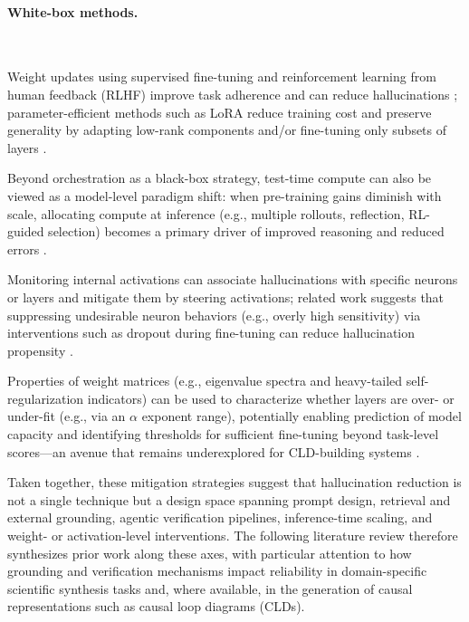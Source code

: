 \paragraph{White-box methods.}~

\begin{description}[style=unboxed,leftmargin=1em,labelindent=0pt]
    \item[Fine-tuning and RLHF.] Weight updates using supervised fine-tuning and reinforcement learning from human feedback (RLHF) improve task adherence and can reduce hallucinations \citep{ouyang2022rlhf}; parameter-efficient methods such as LoRA reduce training cost and preserve generality by adapting low-rank components and/or fine-tuning only subsets of layers \citep{hu2021lora}.

    \item[Test-time compute.] Beyond orchestration as a black-box strategy, test-time compute can also be viewed as a model-level paradigm shift: when pre-training gains diminish with scale, allocating compute at inference (e.g., multiple rollouts, reflection, RL-guided selection) becomes a primary driver of improved reasoning and reduced errors \citep{kaplan2020scaling}.

    \item[Activation monitoring and steering.] Monitoring internal activations can associate hallucinations with specific neurons or layers and mitigate them by steering activations; related work suggests that suppressing undesirable neuron behaviors (e.g., overly high sensitivity) via interventions such as dropout during fine-tuning can reduce hallucination propensity \citep{wang2024adaptive, varshney2023stitch}.

    \item[Predictive analysis of system capacity.] Properties of weight matrices (e.g., eigenvalue spectra and heavy-tailed self-regularization indicators) can be used to characterize whether layers are over- or under-fit (e.g., via an $\alpha$ exponent range), potentially enabling prediction of model capacity and identifying thresholds for sufficient fine-tuning beyond task-level scores---an avenue that remains underexplored for CLD-building systems \citep{martin2021predicting, martin2019traditional}.
\end{description}

\medskip
Taken together, these mitigation strategies suggest that hallucination reduction is not a single technique but a design space spanning prompt design, retrieval and external grounding, agentic verification pipelines, inference-time scaling, and weight- or activation-level interventions. The following literature review therefore synthesizes prior work along these axes, with particular attention to how grounding and verification mechanisms impact reliability in domain-specific scientific synthesis tasks and, where available, in the generation of causal representations such as causal loop diagrams (CLDs).












